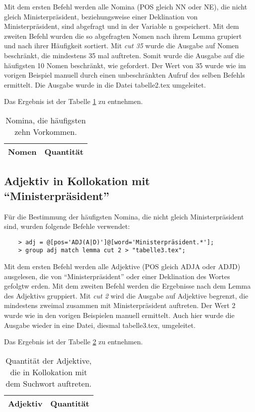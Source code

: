 \documentclass[%
	type=document,%
  	style=article,%
  	media=print,
  	pages=oneside,%
  	prefixLecturer=Dozenten:,
  	author=multiple,
]{unihildesheim}
\begin{document}
Mit dem ersten Befehl werden alle Nomina (POS gleich NN oder NE), die nicht
gleich Ministerpräsident, beziehungsweise einer Deklination von
Ministerpräsident, sind abgefragt und in der Variable n gespeichert. Mit dem
zweiten Befehl wurden die so abgefragten Nomen nach ihrem Lemma grupiert und
nach ihrer Häufigkeit sortiert. Mit \textit{cut 35} wurde die Ausgabe auf Nomen
beschränkt, die mindestens 35 mal auftreten. Somit wurde die Ausgabe auf die
häufigsten 10 Nomen beschränkt, wie gefordert. Der Wert von 35 wurde wie im
vorigen Beispiel manuell durch einen unbeschränkten Aufruf des selben
Befehls ermittelt. Die Ausgabe wurde in die Datei tabelle2.tex umgeleitet. 

Das Ergebnis ist der Tabelle \ref{tab:nomina} zu entnehmen.
\begin{table}[htpb]\label{t}
	\center
	\begin{tabularx}{0.35\textwidth}{lr}
		\toprule
		\textbf{Nomen} & \textbf{Quantität}\\
		\midrule
		
		\bottomrule
	\end{tabularx}
	\caption{Nomina, die häufigsten zehn Vorkommen.}
	\label{tab:nomina}
\end{table}

\subsection{Adjektiv in Kollokation mit "`Ministerpräsident"'}
Für die Bestimmung der häufigsten Nomina, die nicht gleich Ministerpräsident
sind, wurden folgende Befehle verwendet:
\begin{verbatim}
	> adj = @[pos='ADJ(A|D)']@[word='Ministerpräsident.*'];
	> group adj match lemma cut 2 > "tabelle3.tex";
\end{verbatim}
Mit dem ersten Befehl werden alle Adjektive (POS gleich ADJA oder ADJD)
ausgelesen, die von "`Ministerpräsident"' oder einer Deklination des Wortes
gefolgtw erden. Mit dem zweiten Befehl werden die Ergebnisse nach dem Lemma des
Adjektivs gruppiert. Mit \textit{cut 2} wird die Ausgabe auf Adjektive begrenzt, die
mindestens zweimal zusammen mit Ministerpräsident auftreten. Der Wert 2 wurde
wie in den vorigen Beispielen manuell ermittelt. Auch hier wurde die Ausgabe
wieder in eine Datei, diesmal tabelle3.tex, umgeleitet. 

Das Ergebnis ist der Tabelle \ref{tab:adj_mpraes} zu entnehmen.
\begin{table}[htpb]\label{t}
	\center
	\begin{tabularx}{0.5\textwidth}{lr}
		\toprule
		\textbf{Adjektiv} & \textbf{Quantität}\\
		\midrule
		
		\bottomrule
	\end{tabularx}
	\caption{Quantität der Adjektive, die in Kollokation mit dem Suchwort
	auftreten.}
	\label{tab:adj_mpraes}
\end{table}
\end{document}
